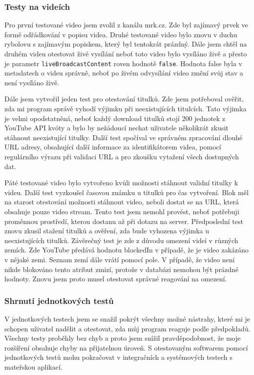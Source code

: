 \subsubsection{Testy na videích}
\par Pro první testované video jsem zvolil  z kanálu mrk.cz. Zde byl zajímavý prvek ve formě odřádkování v popisu videa. Druhé testované video bylo znovu v duchu rybolovu s zajímavým popiskem, který byl tentokrát prázdný. Dále jsem chtěl na druhém videu otestovat živé vysílání neboť toto video bylo vysíláno živě a přesto je parametr \texttt{liveBroadcastContent} roven hodnotě \texttt{false}. Hodnota false byla v metadatech o videu správně, neboť po živém odvysílání video změní svůj stav a není vysíláno živě.
\par Dále jsem vytvořil jeden test pro otestování titulků. Zde jsem potřeboval ověřit, zda mi program správě vyhodí výjimku při neexistujících titulcích. Tato výjimka je velmi opodstatněná, neboť každý download titulků stojí 200 jednotek z YouTube API kvóty a bylo by nežádoucí nechat uživatele několikrát zkusit stáhnout neexistující titulky. Další test spočíval ve správném zpracování dlouhé URL adresy, obsahující další informace za identifikátorem videa, pomocí regulárního výrazu při validaci URL a pro zkoušku vytažení všech dostupných dat.
\par Páté testované video bylo vytvořeno kvůli možnosti stáhnout validní titulky k videu. Další test vyzkoušel časovou známku u titulků pro čas vytvoření. Blok  měl na starost otestování možnosti stáhnout video, neboli dostat se na URL, která obsahuje pouze video stream. Tento test jsem nemohl provést, neboť potřebuji proměnnou prostředí, kterou dostanu až při dotazu na server. Předposlední test znovu zkusil stažení titulků a ověření, zda bude vyhozena výjimka u neexistujících titulků. Závěrečný test je zde z důvodu omezení videí v různých zemích. Zde YouTube předává hodnotu blockedIn v případě, že je video zakázáno v nějaké zemi. Seznam zemí dále vrátí pomocí pole. V případě, že video není nikde blokováno tento atribut zmizí, protože v databázi nemohou být prázdné hodnoty. Znovu jsem proto musel otestovat správné reagování na omezení.
\subsubsection{Shrnutí jednotkových testů}
\par V jednotkových testech jsem se snažil pokrýt všechny možné nástrahy, které mi je schopen uživatel nadělit a otestovat, zda můj program reaguje podle předpokladů. Všechny testy proběhly bez chyb a proto jsem snížil pravděpodobnost, že moje rozšíření obsahuje chyby na přijatelnou úroveň. S otestovaným softwarem pomocí jednotkových testů mohu pokračovat v integračních a systémových testech s mateřskou aplikací.
